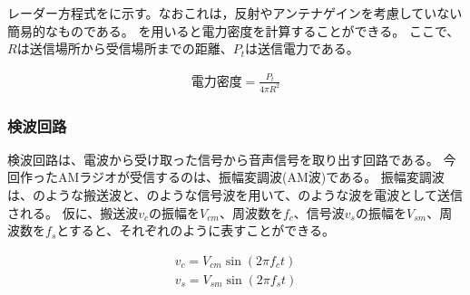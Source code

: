 \documentclass[report.tex]{subfiles}
\begin{document}
レーダー方程式をに示す。なおこれは，反射やアンテナゲインを考慮していない簡易的なものである。
を用いると電力密度を計算することができる。
ここで、\(R\)は送信場所から受信場所までの距離、\(P_t\)は送信電力である。

\begin{align}
	電力密度 = \frac{P_t}{4 \pi R^2} \label{eq:radar}
\end{align}

\subsubsection{検波回路}

検波回路は、電波から受け取った信号から音声信号を取り出す回路である。
今回作ったAMラジオが受信するのは、振幅変調波(AM波)である。
振幅変調波は、のような搬送波と、のような信号波を用いて、のような波を電波として送信される。
仮に、搬送波\(v_c\)の振幅を\(V_{cm}\)、周波数を\(f_c\)、信号波\(v_s\)の振幅を\(V_{sm}\)、周波数を\(f_s\)とすると、それぞれのように表すことができる\cite{電子回路}。

\begin{align}
	v_c = V_{cm} \sin(2 \pi f_c t) \label{eq:v_c} \\
	v_s = V_{sm} \sin(2 \pi f_s t) \label{eq:v_s}
\end{align}
\end{document}
